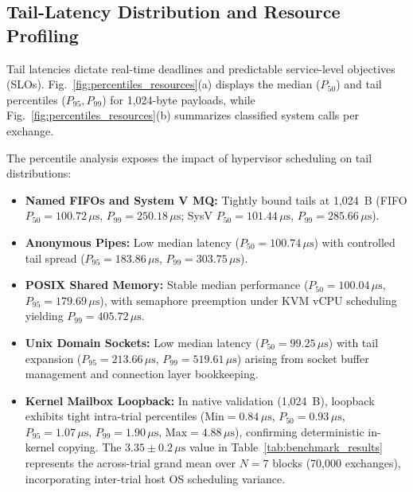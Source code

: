 \subsection{Tail-Latency Distribution and Resource Profiling}
Tail latencies dictate real-time deadlines and predictable service-level objectives (SLOs). Fig.~\ref{fig:percentiles_resources}(a) displays the median ($P_{50}$) and tail percentiles ($P_{95}, P_{99}$) for 1,024-byte payloads, while Fig.~\ref{fig:percentiles_resources}(b) summarizes classified system calls per exchange.

The percentile analysis exposes the impact of hypervisor scheduling on tail distributions:
\begin{itemize}[leftmargin=*,noitemsep,topsep=1.5pt]
    \item \textbf{Named FIFOs and System V MQ:} Tightly bound tails at 1,024~B (FIFO $P_{50} = 100.72\,\mu\text{s}$, $P_{99} = 250.18\,\mu\text{s}$; SysV $P_{50} = 101.44\,\mu\text{s}$, $P_{99} = 285.66\,\mu\text{s}$).
    \item \textbf{Anonymous Pipes:} Low median latency ($P_{50} = 100.74\,\mu\text{s}$) with controlled tail spread ($P_{95} = 183.86\,\mu\text{s}$, $P_{99} = 303.75\,\mu\text{s}$).
    \item \textbf{POSIX Shared Memory:} Stable median performance ($P_{50} = 100.04\,\mu\text{s}$, $P_{95} = 179.69\,\mu\text{s}$), with semaphore preemption under KVM vCPU scheduling yielding $P_{99} = 405.72\,\mu\text{s}$.
    \item \textbf{Unix Domain Sockets:} Low median latency ($P_{50} = 99.25\,\mu\text{s}$) with tail expansion ($P_{95} = 213.66\,\mu\text{s}$, $P_{99} = 519.61\,\mu\text{s}$) arising from socket buffer management and connection layer bookkeeping.
    \item \textbf{Kernel Mailbox Loopback:} In native validation (1,024~B), loopback exhibits tight intra-trial percentiles ($\text{Min} = 0.84\,\mu\text{s}$, $P_{50} = 0.93\,\mu\text{s}$, $P_{95} = 1.07\,\mu\text{s}$, $P_{99} = 1.90\,\mu\text{s}$, $\text{Max} = 4.88\,\mu\text{s}$), confirming deterministic in-kernel copying. The $3.35 \pm 0.2\,\mu\text{s}$ value in Table~\ref{tab:benchmark_results} represents the across-trial grand mean over $N=7$ blocks (70,000 exchanges), incorporating inter-trial host OS scheduling variance.
\end{itemize}


